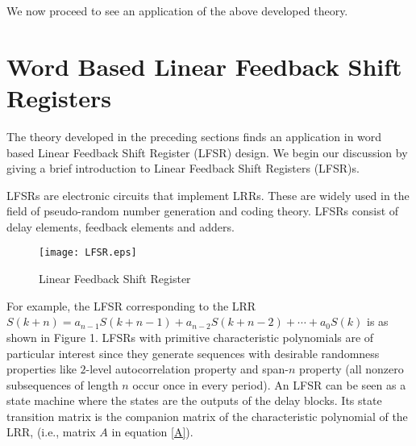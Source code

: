 \documentclass[letterpaper, 12 pt]{article}  \usepackage{amssymb}
\begin{document}
 We now proceed to see an application of the above developed theory.

    
\section{Word Based Linear Feedback Shift Registers}
The theory developed in the preceding sections finds an application in word
based Linear Feedback Shift Register (LFSR) design. We begin our discussion by
giving a brief introduction to Linear Feedback Shift
Registers (LFSR)s. 

LFSRs are electronic circuits that implement LRRs. These are widely used
in the field of pseudo-random number generation and coding theory. LFSRs
consist
of delay elements, feedback elements and adders. 
 {\small
 \begin{figure*}[h]
  \label{spiderman}
       \centering
       \texttt{[image: LFSR.eps]}
 \begin{center}
  \caption{Linear Feedback Shift Register}
 \end{center}
  \end{figure*}
 }
For example, the LFSR corresponding to the LRR $S({k+n}) = a_{n-1}S(k+n-1)+
 a_{n-2}S({k+n-2}) + \cdots + a_0S(k)$ is as shown in Figure 1. LFSRs with
primitive characteristic polynomials are of particular interest since they
generate
sequences with desirable randomness properties like  $2$-level
autocorrelation property and span-$n$ property (all nonzero subsequences of
length $n$ occur once in every period)\cite{Golomb}.
An LFSR can be seen as a state machine where the states are the outputs of the
delay blocks. Its state transition matrix is the companion matrix of the
characteristic polynomial of the LRR, (i.e., matrix $A$ in equation \eqref{A}).
\end{document}

